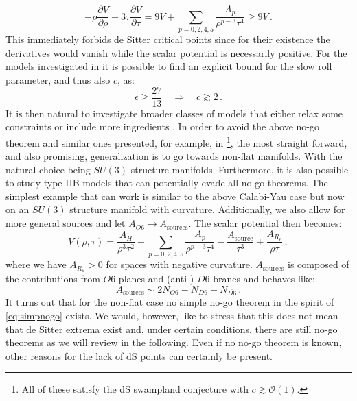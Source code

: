 \documentclass[a4paper,12pt,twoside,openright]{report}
\newcommand{\be}{\begin{equation}}
\newcommand{\ee}{\end{equation}}
\begin{document}
\be 
-\rho \frac{\partial V}{\partial \rho} - 3 \tau \frac{\partial V}{\partial \tau} = 9 V + \sum_{p=0,2,4,5} \frac{A_p}{\rho^ {p-3} \tau^4} \geq 9V\,.
\label{eq:simpnogo}
\ee
This immediately forbids de Sitter critical points since for their existence the derivatives would vanish while the scalar potential is necessarily positive. For the models investigated in \cite{Hertzberg:2007wc} it is possible to find an explicit bound for the slow roll parameter, and thus also $c$, as:
\be 
\epsilon \geq \frac{27}{13} \quad \Rightarrow \quad c \gtrsim 2\,.
\ee 
It is then natural to investigate broader classes of models that either relax some constraints or include more ingredients \cite{Caviezel:2008tf,Flauger:2008ad,Saltman:2004jh,Silverstein:2007ac,Haque:2008jz,Danielsson:2009ff,deCarlos:2009fq,deCarlos:2009qm,Caviezel:2009tu,Danielsson:2010bc,Dong:2010pm,Andriot:2010ju}. In order to avoid the above no-go theorem and similar ones presented, for example, in \cite{Flauger:2008ad,Silverstein:2007ac,Haque:2008jz,Danielsson:2009ff,Caviezel:2009tu,Caviezel:2008ik,Wrase:2010ew,Andriot:2016xvq,Andriot:2017jhf}\footnote{All of these satisfy the dS swampland conjecture with $c \gtrsim \mathcal{O}(1)$.}, the most straight forward, and also promising, generalization is to go towards non-flat manifolds. With the natural choice being $SU(3)$ structure manifolds. Furthermore, it is also possible to study type IIB models that can potentially evade all no-go theorems. The simplest example that can work is similar to the above Calabi-Yau case but now on an $SU(3)$ structure manifold with curvature. Additionally, we also allow for more general sources and let $A_{O6} \to A_{\text{sources}}$. The scalar potential then becomes:
\be 
V(\rho,\tau) = \frac{A_H}{\rho^3 \tau^2} + \sum_{p=0,2,4,5} \frac{A_p}{\rho^ {p-3} \tau^4} - \frac{A_{\text{source}}}{\tau^3} + \frac{A_{R_6}}{\rho\tau}\,,
\label{eq:genscal}
\ee
where we have $A_{R_6}>0$ for spaces with negative curvature. $A_{\text{sources}}$ is composed of the contributions from $O6$-planes and (anti-) $D6$-branes and behaves like:
\be
A_{\text{sourecs}} \sim 2 N_{O6} - N_{D6} - N_{\overline{D6}}\,.
\ee
It turns out that for the non-flat case no simple no-go theorem in the spirit of \eqref{eq:simpnogo} exists. We would, however, like to stress that this does not mean that de Sitter extrema exist \cite{Obied:2018sgi} and, under certain conditions, there are still no-go theorems as we will review in the following. Even if no no-go theorem is known, other reasons for the lack of dS points can certainly be present.
\end{document}
